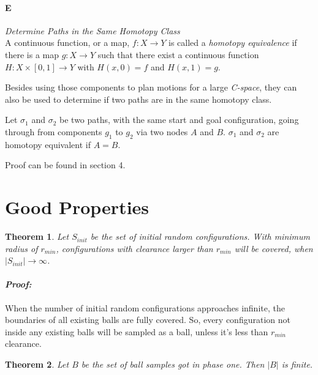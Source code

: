 \documentclass[11pt]{article}
\newtheorem{theorem}{Theorem}[section]
\begin{document}
\paragraph{E} \emph{Determine Paths in the Same Homotopy Class} \hfill \\
\indent A continuous function, or a map, $f: X \rightarrow Y$ is called a \emph{homotopy equivalence} if there is a map $g: X \rightarrow Y$ such that there exist a continuous function $H: X \times [0,1] \rightarrow Y$ with $H(x, 0) = f$ and $H(x,1) = g$.

\indent Besides using those components to plan motions for a large \emph{C-space}, they can also be used to determine if two paths are in the same homotopy class. 

\indent Let $\sigma_1$ and $\sigma_2$ be two paths, with the same start and goal configuration, going through from components $g_1$ to $g_2$ via two nodes $A$ and $B$. $\sigma_1$ and $\sigma_2$ are homotopy equivalent if $A = B$. 

\indent Proof can be found in section 4.

%
\section{Good Properties}\label{properties}
    
  \begin{theorem}
  Let $S_{init}$ be the set of initial random configurations. With minimum radius of $r_{min}$, configurations with clearance larger than $r_{min}$ will be covered, when $|S_{init}| \rightarrow \infty$.
  \end{theorem}
    
  \paragraph{\emph{Proof:}} 
  \indent When the number of initial random configurations approaches infinite, the boundaries of all existing balls are fully covered. So, every configuration not inside any existing balls will be sampled as a ball, unless it's less than $r_{min}$ clearance.

  \begin{theorem}
  Let $B$ be the set of ball samples got in phase one. Then $|B|$ is finite.   
  \end{theorem}
\end{document}
